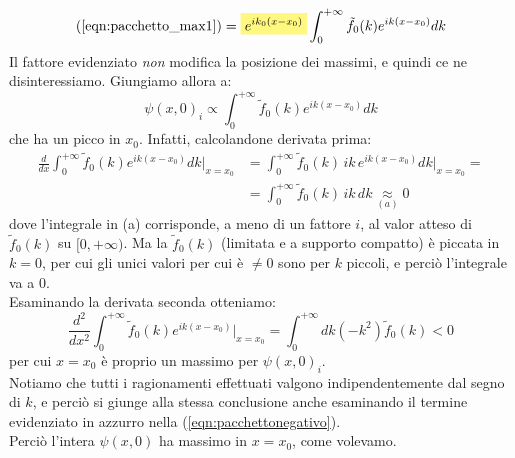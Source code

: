 \documentclass[../../FisicaTeorica.tex]{subfiles}
\begin{document}
\begin{equation}
(\ref{eqn:pacchetto_max1}) = \hlc{Yellow}{e^{ik_0(x-x_0)}}\int_0^{+\infty} \tilde{f}_0(k) e^{ik(x-x_0)}dk
\label{eqn:pacchetto_max2}
\end{equation}
Il fattore evidenziato \textit{non} modifica la posizione dei massimi, e quindi ce ne disinteressiamo. Giungiamo allora a:
\begin{equation}
\psi(x,0)_i\propto\int_0^{+\infty}\tilde{f}_0(k)e^{ik(x-x_0)}dk
\label{eqn:pacchetto_max3}
\end{equation}
che ha un picco in $x_0$. Infatti, calcolandone derivata prima:
\begin{align*}
\frac{d}{dx}\int_0^{+\infty}\tilde{f}_0(k)e^{ik(x-x_0)}dk \Big|_{x=x_0}&=\int_0^{+\infty}\tilde{f}_0(k)\,ik\,e^{ik(x-x_0)}dk\Big|_{x=x_0}=\\
&=\int_0^{+\infty} \tilde{f}_0(k)\,ik\,dk \underset{(a)}{\approx} 0
\end{align*}
dove l'integrale in (a) corrisponde, a meno di un fattore $i$, al valor atteso di $\tilde{f}_0(k)$ su $[0,+\infty)$. Ma la $\tilde{f}_0(k)$ (limitata e a supporto compatto) è piccata in $k=0$, per cui gli unici valori per cui è $\neq 0$ sono per $k$ piccoli, e perciò l'integrale va a $0$.\\
Esaminando la derivata seconda otteniamo:
\[
\frac{d^2}{dx^2}\int_0^{+\infty}
\tilde{f}_0(k)e^{ik(x-x_0)}
 \Big|_{x=x_0} = \int_0^{+\infty} dk (-k^2)\tilde{f}_0(k) < 0
\]
per cui $x=x_0$ è proprio un massimo per $\psi(x,0)_i$.\\
Notiamo che tutti i ragionamenti effettuati valgono indipendentemente dal segno di $k$, e perciò si giunge alla stessa conclusione anche esaminando il termine evidenziato in azzurro nella (\ref{eqn:pacchettonegativo}).\\
Perciò l'intera $\psi(x,0)$ ha massimo in $x=x_0$, come volevamo.\\
\end{document}
